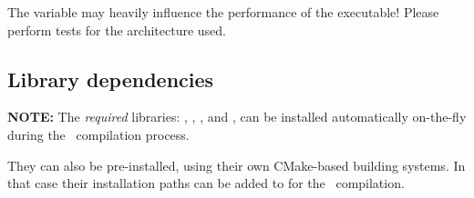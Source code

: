 The variable  may heavily influence the
performance of the executable! Please perform tests for the
architecture used.


\subsection{Library dependencies}
\label{sec:libs}

{\bf NOTE:} The \emph{required} libraries: ,
, , and , can be
installed automatically on-the-fly during the \siesta\ compilation process.

They can also be pre-installed, using their own CMake-based building
systems. In that case their installation paths can be added to
 for the \siesta\ compilation.


